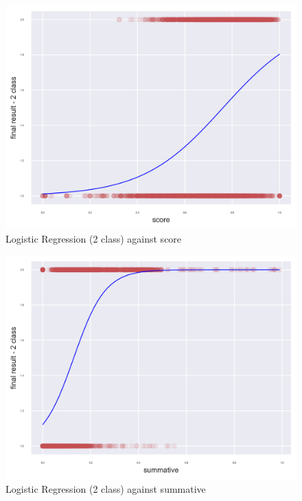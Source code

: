 \documentclass[11pt, a4paper]{article}
\begin{document}
\begin{multicols}{2}
\centering
\begin{figure}[H]
	\includegraphics[width=\linewidth]{LogisticRegression_2_class_model_against_score.png} 
	\caption{Logistic Regression (2 class) against score}
	\label{fig:LogScore}
\end{figure}
\centering
\begin{figure}[H]
	\includegraphics[width=\linewidth]{LogisticRegression_2_class_model_against_summative.png} 
	\caption{Logistic Regression (2 class) against summative}
	\label{fig:LogSumm}
\end{figure}
\centering
\begin{figure}[H]

\end{figure}
\end{multicols}
\end{document}
